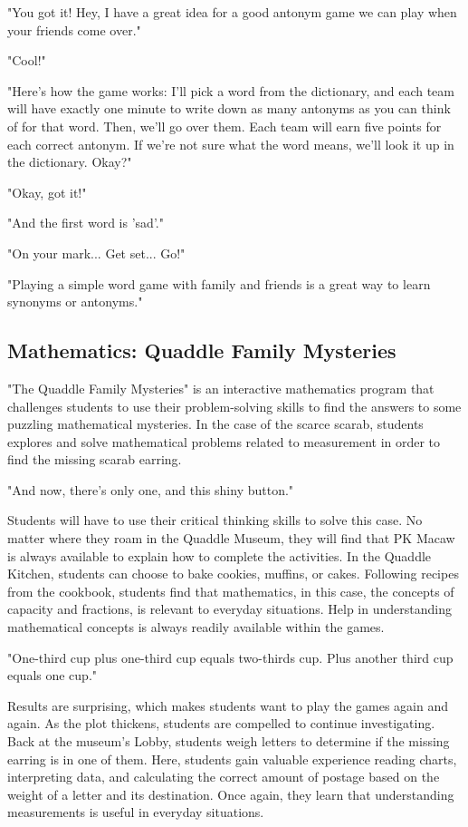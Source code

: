 "You got it!
Hey, I have a great idea for a good antonym game we can play when your friends come over."

"Cool!"

"Here's how the game works: I'll pick a word from the dictionary, and each team will have exactly one minute to write down as many antonyms as you can think of for that word.
Then, we'll go over them.
Each team will earn five points for each correct antonym.
If we're not sure what the word means, we'll look it up in the dictionary.
Okay?"

"Okay, got it!"

"And the first word is 'sad'."

"On your mark... Get set... Go!"

"Playing a simple word game with family and friends is a great way to learn synonyms or antonyms."

\subsection{Mathematics: Quaddle Family Mysteries}

"The Quaddle Family Mysteries" is an interactive mathematics program that challenges students to use their problem-solving skills to find the answers to some puzzling mathematical mysteries.
In the case of the scarce scarab, students explores and solve mathematical problems related to measurement in order to find the missing scarab earring.

"And now, there's only one, and this shiny button."

Students will have to use their critical thinking skills to solve this case.
No matter where they roam in the Quaddle Museum, they will find that PK Macaw is always available to explain how to complete the activities.
In the Quaddle Kitchen, students can choose to bake cookies, muffins, or cakes.
Following recipes from the cookbook, students find that mathematics, in this case, the concepts of capacity and fractions, is relevant to everyday situations.
Help in understanding mathematical concepts is always readily available within the games.

"One-third cup plus one-third cup equals two-thirds cup.
Plus another third cup equals one cup."

Results are surprising, which makes students want to play the games again and again.
As the plot thickens, students are compelled to continue investigating.
Back at the museum's Lobby, students weigh letters to determine if the missing earring is in one of them.
Here, students gain valuable experience reading charts, interpreting data, and calculating the correct amount of postage based on the weight of a letter and its destination.
Once again, they learn that understanding measurements is useful in everyday situations.

